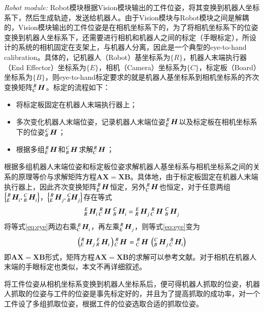\emph{Robot module:}
Robot模块根据Vision模块输出的工件位姿，将其变换到机器人坐标系下，然后生成轨迹，发送给机器人。由于Vision模块与Robot模块之间是解耦的，Vision模块输出的工件位姿是在相机坐标系下的，为了将相机坐标系下的位姿变换到机器人坐标系下，还需要进行相机和机器人之间的标定（手眼标定），所设计的系统的相机固定在支架上，与机器人分离，因此是一个典型的eye-to-hand calibration。具体的，记机器人（Robot）基坐标系为$\{R\}$，机器人末端执行器（End Effector）坐标系为$\{E\}$，相机（Camera）坐标系为$\{C\}$，标定板（Board）坐标系为$\{B\}$，则eye-to-hand标定要求的就是机器人基坐标系到相机坐标系的齐次变换矩阵$\tensor*[^R_C]{\,\bm{H}}{}$。标定的流程如下：
\begin{itemize}
\item 将标定板固定在机器人末端执行器上；
\item 多次变化机器人末端位姿，记录机器人末端位姿$\tensor*[^R_E]{\,\bm{H}}{}$以及标定板在相机坐标系下的位姿$\tensor*[^C_B]{\,\bm{H}}{}$；
\item 根据多组$\tensor*[^R_E]{\,\bm{H}}{}$和$\tensor*[^C_B]{\,\bm{H}}{}$求解$\tensor*[^R_C]{\,\bm{H}}{}$；
\end{itemize}
根据多组机器人末端位姿和标定板位姿求解机器人基坐标系与相机坐标系之间的关系的原理等价与求解矩阵方程$\bm{A}\bm{X}=\bm{X}\bm{B}$。具体地，由于标定板固定在机器人末端执行器上，因此齐次变换矩阵$\tensor*[^B_E]{\,\bm{H}}{}$恒定，另外$\tensor*[^R_C]{\,\bm{H}}{}$也恒定，对于任意两组$\left\{\tensor*[^R_E]{\,\bm{H}}{_i},\tensor*[^C_B]{\,\bm{H}}{_i}\right\}$，$\left\{\tensor*[^R_E]{\,\bm{H}}{_j},\tensor*[^C_B]{\bm{H}}{_j}\right\}$存在等式
\begin{equation}
  \label{eq:eye}
  \tensor*[^E_R]{\,\bm{H}}{_i} \, \tensor*[^R_C]{\,\bm{H}}{} \, \tensor*[^C_B]{\,\bm{H}}{_i} = \tensor*[^E_R]{\,\bm{H}}{_j} \, \tensor*[^R_C]{\,\bm{H}}{} \, \tensor*[^C_B]{\,\bm{H}}{_j}
\end{equation}
将等式\ref{eq:eye}两边右乘$\tensor*[^B_C]{\,\bm{H}}{_i}$，再左乘$\tensor*[^R_E]{\,\bm{H}}{_j}$，则等式\ref{eq:eye}变为
\begin{equation}
  \label{eq:eye}
  \left(\tensor*[^R_E]{\,\bm{H}}{_j} \, \tensor*[^E_R]{\,\bm{H}}{_i} \,\right) \tensor*[^R_C]{\,\bm{H}}{} = \tensor*[^R_C]{\,\bm{H}}{} \, \left(\tensor*[^C_B]{\,\bm{H}}{_j} \, \tensor*[^B_C]{\,\bm{H}}{_i}\right)
\end{equation}
即$\bm{A}\bm{X}=\bm{X}\bm{B}$形式，矩阵方程$\bm{A}\bm{X}=\bm{X}\bm{B}$的求解可以参考文献\cite{daniilidis1999hand}。对于相机在机器人末端的手眼标定也类似，本文不再详细叙述。


将工件位姿从相机坐标系变换到机器人坐标系后，便可得机器人抓取的位姿，机器人抓取的位姿与工件的位姿是事先标定好的，并且为了提高抓取的成功率，对一个工件设了多组抓取位姿，根据工件的位姿选取合适的抓取位姿。

